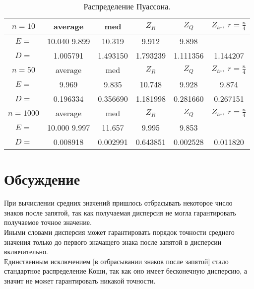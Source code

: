 \documentclass[a4]{article}
\begin{document}
		\begin{table}[h]
			\caption{ Распределение Пуассона.}
			\begin{center}
				\begin{tabular}{|c|c|c|c|c|c|}
					\hline
					$n = 10$   & average & med & $Z_R$ & $Z_Q$ & $Z_{tr},\;r=\frac{n}{4}$\\ \hline
					$E =$     & 10.040        9.899        & 10.319     &   9.912      &   9.898 \\ \hline
					$D =$     &  	1.005791   &      1.493150  &       1.793239      &   1.111356      &   1.144207\\ \hline
					
					$n = 50$   & average & med & $Z_R$ & $Z_Q$ & $Z_{tr},\;r=\frac{n}{4}$\\ \hline
					$E =$      & 	9.969     &    9.835  &       10.748     &   9.928     &    9.874    \\ \hline
					$D =$       &	0.196334     &   0.356690   &      1.181998      &   0.281660      &   0.267151  \\ \hline
					
					$n = 1000$   & average & med & $Z_R$ & $Z_Q$ & $Z_{tr},\;r=\frac{n}{4}$\\ \hline
					$E =$      & 10.000        9.997     &    11.657    &    9.995  &       9.853\\ \hline
					$D =$      & 	0.008918   &      0.002991  &       0.643851      &   0.002528      &   0.011820  \\
					\hline
				\end{tabular}
			\end{center}
		\end{table}
		\newpage
			
	\section{Обсуждение}
		\par При вычислении средних значений пришлось отбрасывать некоторое число знаков после запятой, так как получаемая дисперсия не могла гарантировать получаемое точное значение. \\
		Иными словами дисперсия может гарантировать порядок точности среднего значения только до первого значащего знака после запятой в дисперсии включительно.\\ Единственным исключением [в отбрасывании знаков после запятой] стало стандартное распределение Коши, так как оно имеет бесконечную дисперсию, а значит не может гарантировать никакой точности.
		
\end{document}
